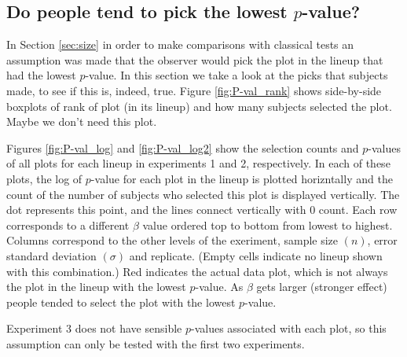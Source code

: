 \documentclass{article}
\newcommand{\green}[1]{{\color{green} #1}} %
\begin{document}
\subsection{Do people tend to pick the lowest $p$-value?}

In Section \ref{sec:size} in order to make comparisons with classical tests an assumption was made that the observer would pick the plot in the lineup that had the lowest $p$-value. In this section we take a look at the picks that subjects made, to see if this is, indeed, true. Figure \ref{fig:P-val_rank} shows side-by-side boxplots of rank of plot (in its lineup) and how many subjects selected the plot. \green{Maybe we don't need this plot.} 

Figures \ref{fig:P-val_log} and \ref{fig:P-val_log2} show the selection counts and $p$-values of all plots for each lineup in experiments 1 and 2, respectively. In each of these plots, the log of $p$-value for each plot in the lineup is plotted horizntally and the count of the number of subjects who selected this plot is displayed vertically. The dot represents this point, and the lines connect vertically with 0 count. Each row corresponds to a different $\beta$ value ordered top to bottom from lowest to highest. Columns correspond to the other levels of the exeriment, sample size $(n)$, error standard deviation $(\sigma)$ and replicate. (Empty cells indicate no lineup shown with this combination.) Red indicates the actual data plot, which is not always the plot in the lineup with the lowest $p$-value. As $\beta$ gets larger (stronger effect) people tended to select the plot with the lowest $p$-value. 

Experiment 3 does not have sensible $p$-values associated with each plot, so this assumption can only be tested with the first two experiments. 

\end{document}
